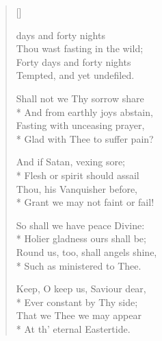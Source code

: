 \newHymn
{}

\begin{verse}[\versewidth]

 days and forty nights\\
Thou wast fasting in the wild;\\
Forty days and forty nights\\
Tempted, and yet undefiled.


Shall not we Thy sorrow share\\*
And from earthly joys abstain,\\
Fasting with unceasing prayer,\\*
Glad with Thee to suffer pain?

And if Satan, vexing sore;\\*
Flesh or spirit should assail\\
Thou, his Vanquisher before,\\*
Grant we may not faint or fail!

So shall we have peace Divine:\\*
Holier gladness ours shall be;\\
Round us, too, shall angels shine,\\*
Such as ministered to Thee.

Keep, O keep us, Saviour dear,\\*
Ever constant by Thy side;\\
That we Thee we may appear\\*
At th' eternal Eastertide.

\end{verse}



